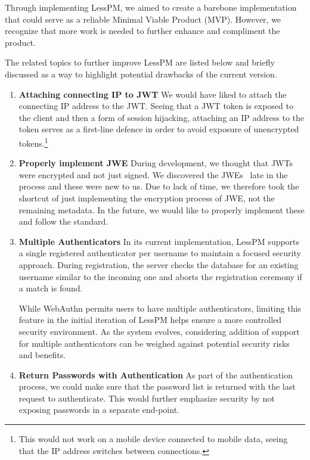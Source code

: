 Through implementing LessPM, we aimed to create a barebone implementation that
could serve as a reliable Minimal Viable Product (MVP).
However, we recognize that more work is needed to further enhance and compliment
the product.

The related topics to further improve LessPM are listed below and briefly
discussed as a way to highlight potential drawbacks of the current version.

    \begin{enumerate}[label=$\blacktriangleright$]
        \item \textbf{Attaching connecting IP to JWT}
        \newline We would have liked to attach the connecting IP address to the
        JWT\@.
        Seeing that a JWT token is exposed to the client and then a form of
        session hijacking, attaching an IP address to the token serves as a
        first-line defence in order to avoid exposure of unencrypted
        tokens.\footnote{
            This would not work on a mobile device connected to mobile data,
            seeing that the IP address switches between connections.
        }
        \item \textbf{Properly implement JWE}
        \newline During development, we thought that JWTs were encrypted and
        not just signed.
        We discovered the JWEs~\cite{rfc7516} late in the process and these
        were new to us.
        Due to lack of time, we therefore took the shortcut of just
        implementing the encryption process of JWE, not the remaining metadata.
        In the future, we would like to properly implement these and follow
        the standard.
        \item \textbf{Multiple Authenticators}
        \newline In its current implementation, LessPM supports a single
        registered authenticator per username to maintain a focused security
        approach.
        During registration, the server checks the database for an existing
        username similar to the incoming one and aborts the registration
        ceremony if a match is found.

        While WebAuthn permits users to have multiple authenticators, limiting
        this feature in the initial iteration of LessPM helps ensure a more
        controlled security environment.
        As the system evolves, considering addition of support for multiple
        authenticators can be weighed against potential security risks and
        benefits.
        \item \textbf{Return Passwords with Authentication}
        \newline As part of the authentication process, we could make sure
        that the password list is returned with the last request to
        authenticate.
        This would further emphasize security by not exposing passwords in a
        separate end-point.


\end{enumerate}
